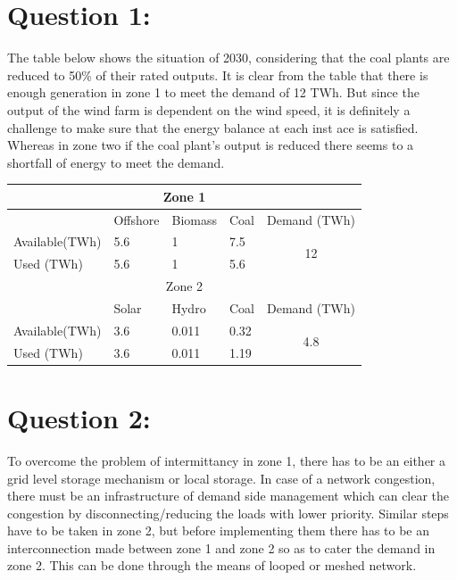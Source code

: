 \section*{\textbf{Question 1:}}


The table below shows the situation of 2030, considering that the coal plants are reduced to 50\% of their rated outputs.
It is clear from the table that there is enough generation in zone 1 to meet the demand of  12 TWh. But since the output of the wind farm is dependent on the wind speed, it is definitely a challenge to make sure that the energy balance at each inst ace is satisfied.\\
Whereas in zone two if the coal plant's output is reduced there seems to a shortfall of energy to meet the demand. 


\begin{table}[H]
\centering
\begin{tabular}{|l|l|l|l|c|}
\hline
\multicolumn{5}{|c|}{Zone 1}                                                   \\ \hline
               & Offshore & Biomass & Coal & \multicolumn{1}{l|}{Demand (TWh)} \\ \hline
Available(TWh) & 5.6      & 1       & 7.5  & \multirow{2}{*}{12}               \\ \cline{1-4}
Used (TWh)     & 5.6      & 1       & 5.6  &                                   \\ \hline
\multicolumn{5}{|c|}{Zone 2}                                                   \\ \hline
               & Solar    & Hydro   & Coal & \multicolumn{1}{l|}{Demand (TWh)} \\ \hline
Available(TWh) & 3.6      & 0.011   & 0.32 & \multirow{2}{*}{4.8}              \\ \cline{1-4}
Used (TWh)     & 3.6      & 0.011   & 1.19 &                                   \\ \hline
\end{tabular}
\end{table}
\section*{\textbf{Question 2:}}
To overcome the problem of intermittancy in zone 1, there has to be an either a grid level storage mechanism or local storage. In case of a network congestion, there must be an infrastructure of demand side management which can clear the congestion by disconnecting/reducing the loads with lower priority.
Similar steps have to be taken in zone 2, but before implementing them there has to be an interconnection made between zone 1 and zone 2 so as to cater the demand in zone 2. This can be done through the means of looped or meshed network.
